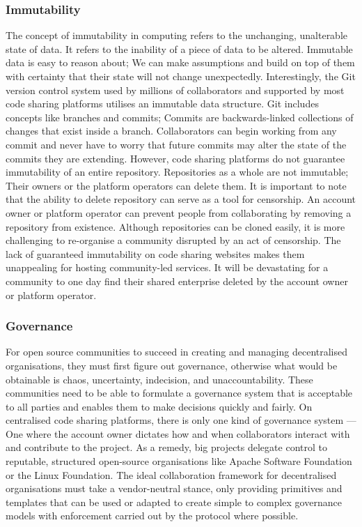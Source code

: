 \subsubsection{Immutability}
The concept of immutability in computing refers to the unchanging, unalterable state of data. It refers to the inability of a piece of data to be altered. Immutable data is easy to reason about; We can make assumptions and build on top of them with certainty that their state will not change unexpectedly. Interestingly, the Git version control system used by millions of collaborators and supported by most code sharing platforms utilises an immutable data structure. Git includes concepts like branches and commits; Commits are backwards-linked collections of changes that exist inside a branch. Collaborators can begin working from any commit and never have to worry that future commits may alter the state of the commits they are extending. However, code sharing platforms do not guarantee immutability of an entire repository. Repositories as a whole are not immutable; Their owners or the platform operators can delete them. It is important to note that the ability to delete repository can serve as a tool for censorship. An account owner or platform operator can prevent people from collaborating by removing a repository from existence. Although repositories can be cloned easily, it is more challenging to re-organise a community disrupted by an act of censorship. The lack of guaranteed immutability on code sharing websites makes them unappealing for hosting community-led services. It will be devastating for a community to one day find their shared enterprise deleted by the account owner or platform operator.

\subsubsection{Governance}
For open source communities to succeed in creating and managing decentralised organisations, they must first figure out governance, otherwise what would be obtainable is chaos, uncertainty, indecision, and unaccountability. These communities need to be able to formulate a governance system that is acceptable to all parties and enables them to make decisions quickly and fairly. On centralised code sharing platforms, there is only one kind of governance system — One where the account owner dictates how and when collaborators interact with and contribute to the project. As a remedy, big projects delegate control to reputable, structured open-source organisations like Apache Software Foundation or the Linux Foundation. The ideal collaboration framework for decentralised organisations must take a vendor-neutral stance, only providing primitives and templates that can be used or adapted to create simple to complex governance models with enforcement carried out by the protocol where possible.

